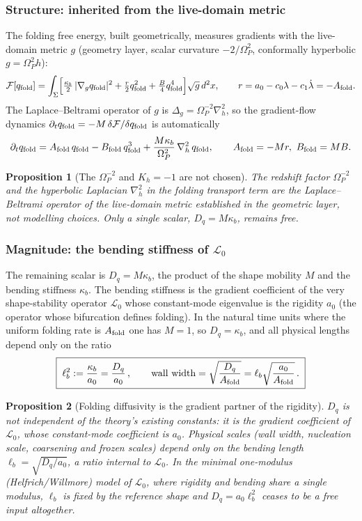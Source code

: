 \documentclass[11pt,a4paper]{article}
\newcommand{\Op}{\Omega_P}
\newcommand{\laph}{\nabla_h^2}
\newcommand{\qf}{q_{\rm fold}}
\newcommand{\Af}{A_{\rm fold}}
\newcommand{\Bf}{B_{\rm fold}}
\newcommand{\Dq}{D_q}
\newcommand{\lb}{\ell_b}
\newcommand{\kb}{\kappa_b}
\newcommand{\Lop}{\mathcal L_0}
\theoremstyle{plain}
\newtheorem{proposition}{Proposition}[section]
\theoremstyle{definition}
\theoremstyle{remark}
\begin{document}
\subsubsection{Structure: inherited from the live-domain metric}
The folding free energy, built geometrically, measures gradients with the live-domain metric $g$
(geometry layer, scalar curvature $-2/\Op^2$, conformally hyperbolic $g=\Op^2 h$):
\begin{equation}
\mathcal F[\qf]=\int_\Sigma\Bigl[\tfrac{\kb}{2}\,|\nabla_g\qf|^{2}
+\tfrac{r}{2}\qf^{2}+\tfrac{B}{4}\qf^{4}\Bigr]\sqrt{g}\,d^2x,
\qquad r=a_0-c_0\lambda-c_1\dot\lambda=-\Af .
\end{equation}
The Laplace--Beltrami operator of $g$ is $\Delta_g=\Op^{-2}\laph$, so the gradient-flow dynamics
$\partial_t\qf=-M\,\delta\mathcal F/\delta\qf$ is automatically
\begin{equation}
\partial_t\qf=\Af\,\qf-\Bf\,\qf^{3}+\frac{M\kb}{\Op^{2}}\,\laph\,\qf,
\qquad \Af=-Mr,\ \Bf=MB .
\end{equation}

\begin{proposition}[The $\Op^{-2}$ and $K_h=-1$ are not chosen]
The redshift factor $\Op^{-2}$ and the hyperbolic Laplacian $\laph$ in the folding transport term are the
Laplace--Beltrami operator of the live-domain metric established in the geometric layer, not modelling
choices. Only a single scalar, $\Dq=M\kb$, remains free.
\end{proposition}

\subsubsection{Magnitude: the bending stiffness of $\Lop$}
The remaining scalar is $\Dq=M\kb$, the product of the shape mobility $M$ and the bending stiffness
$\kb$. The bending stiffness is the gradient coefficient of the very shape-stability operator
$\Lop$ whose constant-mode eigenvalue is the rigidity $a_0$ (the operator whose bifurcation defines
folding). In the natural time units where the uniform folding rate is $\Af$ one has $M=1$, so
$\Dq=\kb$, and all physical lengths depend only on the ratio
\begin{equation}
\boxed{\;\lb^{2}:=\frac{\kb}{a_0}=\frac{\Dq}{a_0}\,,\qquad
\text{wall width}=\sqrt{\frac{\Dq}{\Af}}=\lb\sqrt{\frac{a_0}{\Af}}\,.\;}
\end{equation}

\begin{proposition}[Folding diffusivity is the gradient partner of the rigidity]
$\Dq$ is not independent of the theory's existing constants: it is the gradient coefficient of $\Lop$,
whose constant-mode coefficient is $a_0$. Physical scales (wall width, nucleation scale, coarsening and
frozen scales) depend only on the bending length $\lb=\sqrt{\Dq/a_0}$, a ratio internal to $\Lop$. In the
minimal one-modulus (Helfrich/Willmore) model of $\Lop$, where rigidity and bending share a single
modulus, $\lb$ is fixed by the reference shape and $\Dq=a_0\lb^2$ ceases to be a free input altogether.
\end{proposition}
\end{document}
